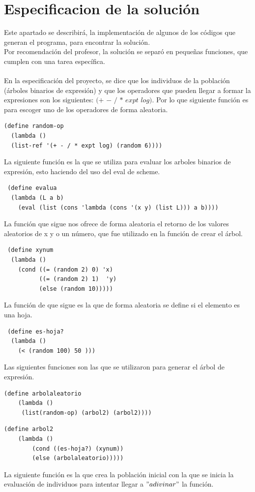 \documentclass[10pt,a4paper]{article}
\begin{document}
\section{Especificacion de la solución}
 Este apartado se describirá, la implementación de algunos  de los códigos que generan el programa, para encontrar la solución.\\
Por recomendación del profesor, la solución se separó en pequeñas funciones, que cumplen con una tarea específica.\\\\
En la especificación del proyecto, se dice que los individuos de la población (árboles binarios de expresión) y que los operadores que pueden llegar a formar la expresiones son los siguientes: $(+$ $-$ $/$ $*$ $expt$ $log)$. Por lo que siguiente función es para escoger uno de los operadores de forma aleatoria.  
\begin{verbatim}
(define random-op
  (lambda ()
  (list-ref '(+ - / * expt log) (random 6))))
\end{verbatim}
 La siguiente función es la que se utiliza para evaluar los arboles binarios de expresión, esto haciendo del uso del eval de scheme. 
 \begin{verbatim}
 (define evalua
  (lambda (L a b)
    (eval (list (cons 'lambda (cons '(x y) (list L))) a b))))
 \end{verbatim}
 La función que sigue nos ofrece de forma aleatoria el retorno de los valores aleatorios de x y o un número, que fue utilizado en la función de crear el árbol.
 \begin{verbatim}
 (define xynum
  (lambda ()
    (cond ((= (random 2) 0) 'x)
          ((= (random 2) 1)  'y)
          (else (random 10)))))
\end{verbatim}
 La función de que sigue es la que de forma aleatoria se define si el elemento es una hoja. 
 \begin{verbatim}
 (define es-hoja?
  (lambda ()
    (< (random 100) 50 )))
 \end{verbatim}
 Las siguientes funciones son las que se utilizaron para generar el árbol de expresión.
 \begin{verbatim}
(define arbolaleatorio
	(lambda ()
	 (list(random-op) (arbol2) (arbol2))))
\end{verbatim}
\begin{verbatim}
(define arbol2
	(lambda ()
		(cond ((es-hoja?) (xynum))
		(else (arbolaleatorio)))))
\end{verbatim}  
La siguiente función es la que crea la población inicial con la que se inicia la evaluación de individuos para intentar llegar a $"adivinar"$ la función.
\end{document}

